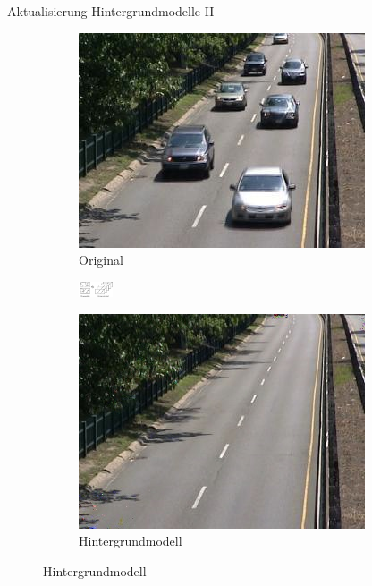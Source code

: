 \documentclass[hyperref={pdfpagelabels=false}]{beamer}
\begin{document}
\begin{frame}{Aktualisierung Hintergrundmodelle II}
	\begin{figure}
		\captionsetup[subfigure]{labelformat=empty}
		\begin{subfigure}{.3\linewidth}
			\centering
			\includegraphics[width=\linewidth]{./Bilder/backup_bilder/orig0823}
			\caption{Original}
		\end{subfigure}
		\begin{subfigure}{.3\linewidth}
			\centering
			\includegraphics[width=1cm]{./Bilder/backup_bilder/pfeil.pdf}
		\end{subfigure}
		\begin{subfigure}{.3\linewidth}
			\centering
			\includegraphics[width=\linewidth]{./Bilder/backup_bilder/hintergrundmodell0823}
			\caption{Hintergrundmodell}
		\end{subfigure}
	

\end{figure}
\end{frame}
\end{document}
